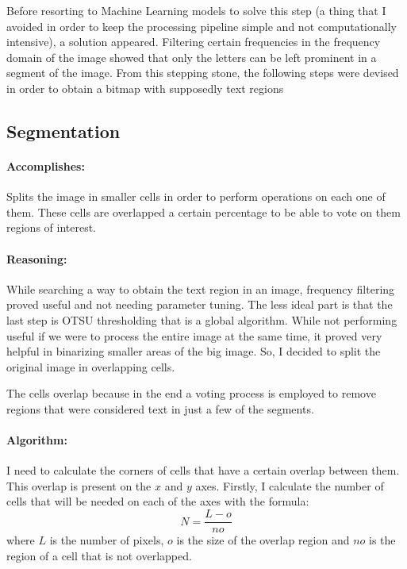 Before resorting to Machine Learning models to solve this step (a thing that I avoided in order to keep the processing pipeline simple and not computationally intensive), a solution appeared. Filtering certain frequencies in the frequency domain of the image showed that only the letters can be left prominent in a segment of the image. From this stepping stone, the following steps were devised in order to obtain a bitmap with supposedly text regions

\subsection{Segmentation}
\label{subsec:segmentation}

\paragraph*{Accomplishes:}\mbox{}\par
Splits the image in smaller cells in order to perform operations on each one of them. These cells are overlapped a certain percentage to be able to vote on them regions of interest.

\paragraph*{Reasoning:}\mbox{}\par
While searching a way to obtain the text region in an image, frequency filtering proved useful and not needing parameter tuning. The less ideal part is that the last step is OTSU thresholding that is a global algorithm. While not performing useful if we were to process the entire image at the same time, it proved very helpful in binarizing smaller areas of the big image. So, I decided to split the original image in overlapping cells.

The cells overlap because in the end a voting process is employed to remove regions that were considered text in just a few of the segments.

\paragraph*{Algorithm:}\mbox{}\par
I need to calculate the corners of cells that have a certain overlap between them. This overlap is present on the $x$ and $y$ axes. Firstly, I calculate the number of cells that will be needed on each of the axes with the formula:
\[N = \frac{L - o}{no}\]
where $L$ is the number of pixels, $o$ is the size of the overlap region and $no$ is the region of a cell that is not overlapped.


